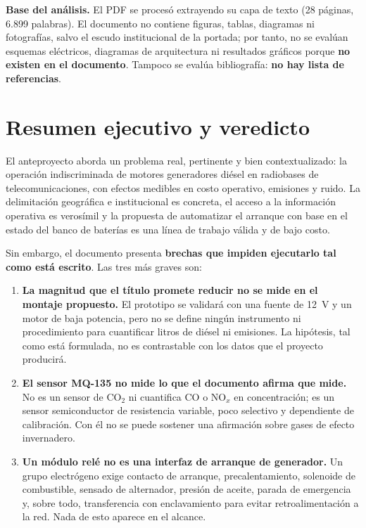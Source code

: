 \documentclass[11pt,a4paper]{article}
\begin{document}
\begin{cajaRecuerda}
\textbf{Base del análisis.} El PDF se procesó extrayendo su capa de texto (28 páginas, 6.899 palabras). El documento no contiene figuras, tablas, diagramas ni fotografías, salvo el escudo institucional de la portada; por tanto, no se evalúan esquemas eléctricos, diagramas de arquitectura ni resultados gráficos porque \textbf{no existen en el documento}. Tampoco se evalúa bibliografía: \textbf{no hay lista de referencias}.
\end{cajaRecuerda}

\section{Resumen ejecutivo y veredicto}

El anteproyecto aborda un problema real, pertinente y bien contextualizado: la operación indiscriminada de motores generadores diésel en radiobases de telecomunicaciones, con efectos medibles en costo operativo, emisiones y ruido. La delimitación geográfica e institucional es concreta, el acceso a la información operativa es verosímil y la propuesta de automatizar el arranque con base en el estado del banco de baterías es una línea de trabajo válida y de bajo costo.

Sin embargo, el documento presenta \textbf{brechas que impiden ejecutarlo tal como está escrito}. Las tres más graves son:

\begin{enumerate}[leftmargin=1.4em]
  \item \textbf{La magnitud que el título promete reducir no se mide en el montaje propuesto.} El prototipo se validará con una fuente de 12~V y un motor de baja potencia, pero no se define ningún instrumento ni procedimiento para cuantificar litros de diésel ni emisiones. La hipótesis, tal como está formulada, no es contrastable con los datos que el proyecto producirá.
  \item \textbf{El sensor MQ-135 no mide lo que el documento afirma que mide.} No es un sensor de CO$_2$ ni cuantifica CO o NO$_x$ en concentración; es un sensor semiconductor de resistencia variable, poco selectivo y dependiente de calibración. Con él no se puede sostener una afirmación sobre gases de efecto invernadero.
  \item \textbf{Un módulo relé no es una interfaz de arranque de generador.} Un grupo electrógeno exige contacto de arranque, precalentamiento, solenoide de combustible, sensado de alternador, presión de aceite, parada de emergencia y, sobre todo, transferencia con enclavamiento para evitar retroalimentación a la red. Nada de esto aparece en el alcance.
\end{enumerate}
\end{document}
